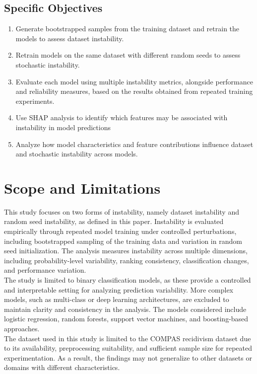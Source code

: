 \documentclass{article}
\begin{document}
\subsection{Specific Objectives}
\begin{enumerate}
  \item Generate bootstrapped samples from the training dataset and retrain the models to assess dataset instability.
  \item Retrain models on the same dataset with different random seeds to assess stochastic instability.
  \item Evaluate each model using multiple instability metrics, alongside performance and reliability measures, based on the results obtained from repeated training experiments.
  \item Use SHAP analysis to identify which features may be associated with instability in model predictions
  \item Analyze how model characteristics and feature contributions influence dataset and stochastic instability across models.
\end{enumerate}

\section{Scope and Limitations} %
\tab%
This study focuses on two forms of instability, namely dataset instability and random seed instability, as defined in this paper. Instability is evaluated empirically through repeated model training under controlled perturbations, including bootstrapped sampling of the training data and variation in random seed initialization. The analysis measures instability across multiple dimensions, including probability-level variability, ranking consistency, classification changes, and performance variation.\\

The study is limited to binary classification models, as these provide a controlled and interpretable setting for analyzing prediction variability. More complex models, such as multi-class or deep learning architectures, are excluded to maintain clarity and consistency in the analysis. The models considered include logistic regression, random forests, support vector machines, and boosting-based approaches.\\

The dataset used in this study is limited to the COMPAS recidivism dataset due to its availability, preprocessing suitability, and sufficient sample size for repeated experimentation. As a result, the findings may not generalize to other datasets or domains with different characteristics.\\
\end{document}
